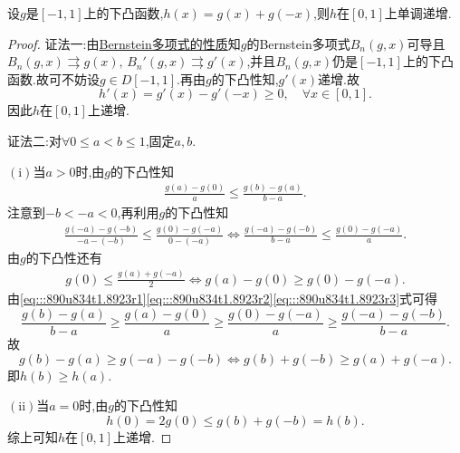 \documentclass[../../main.tex]{subfiles}%
\begin{document}
\begin{proposition}\label{proposition:下凸函数可构造右半递增偶函数}
设$g$是$[-1,1]$上的下凸函数,$h(x)=g(x)+g(-x)$,则$h$在$[0,1]$上单调递增.
\end{proposition}
\begin{proof}

{\color{blue}证法一:}由\hyperref[theorem:Bernstein多项式的性质]{Bernstein多项式的性质}知$g$的Bernstein多项式$B_n(g,x)$可导且$B_n(g,x) \rightrightarrows  g(x),\, B_n'(g,x)\rightrightarrows  g'(x)$,并且$B_n(g,x)$仍是$[-1,1]$上的下凸函数.故可不妨设$g\in D[-1,1]$.再由$g$的下凸性知,$g'(x)$递增.故
$$
h'(x)=g'(x)-g'(-x)\geqslant 0,\quad \forall x\in [0,1].
$$
因此$h$在$[0,1]$上递增.

{\color{blue}证法二:}对$\forall 0\leqslant a<b\leqslant 1$,固定$a,b.$

$\left( \mathrm{i} \right)$当$a>0$时,由$g$的下凸性知
\begin{align}\label{eq:::890u834t1.8923r1}
\frac{g\left( a \right) -g\left( 0 \right)}{a}\leqslant \frac{g\left( b \right) -g\left( a \right)}{b-a}.
\end{align}
注意到$-b<-a<0$,再利用$g$的下凸性知
\begin{align}\label{eq:::890u834t1.8923r2}
\frac{g\left( -a \right) -g\left( -b \right)}{-a-\left( -b \right)}\leqslant \frac{g\left( 0 \right) -g\left( -a \right)}{0-\left( -a \right)}\Longleftrightarrow \frac{g\left( -a \right) -g\left( -b \right)}{b-a}\leqslant \frac{g\left( 0 \right) -g\left( -a \right)}{a}.
\end{align}
由$g$的下凸性还有
\begin{align}\label{eq:::890u834t1.8923r3}
g\left( 0 \right) \leqslant \frac{g\left( a \right) +g\left( -a \right)}{2}\Longleftrightarrow g\left( a \right) -g\left( 0 \right) \geqslant g\left( 0 \right) -g\left( -a \right).
\end{align}
由\eqref{eq:::890u834t1.8923r1}\eqref{eq:::890u834t1.8923r2}\eqref{eq:::890u834t1.8923r3}式可得
$$\frac{g\left( b \right) -g\left( a \right)}{b-a}\geqslant \frac{g\left( a \right) -g\left( 0 \right)}{a}\geqslant \frac{g\left( 0 \right) -g\left( -a \right)}{a}\geqslant \frac{g\left( -a \right) -g\left( -b \right)}{b-a}.$$
故
$$g\left( b \right) -g\left( a \right) \geqslant g\left( -a \right) -g\left( -b \right) \Longleftrightarrow g\left( b \right) +g\left( -b \right) \geqslant g\left( a \right) +g\left( -a \right).$$
即$h\left( b \right) \geqslant h\left( a \right)$.

$\left( \mathrm{ii} \right)$当$a=0$时,由$g$的下凸性知
$$h\left( 0 \right) =2g\left( 0 \right) \leqslant g\left( b \right) +g\left( -b \right) =h\left( b \right).$$
综上可知$h$在$\left[ 0,1 \right]$上递增.
\end{proof}
\end{document}
